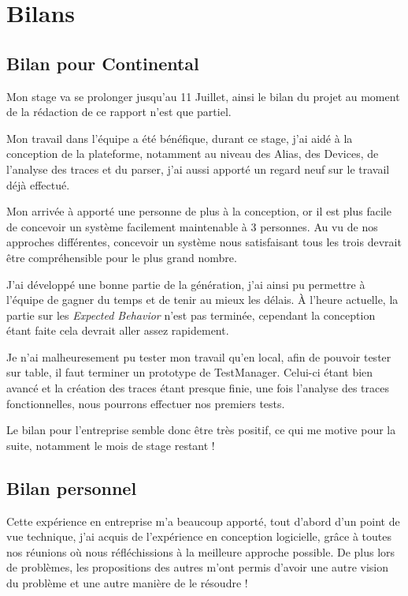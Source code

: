 \chapter{Bilans}
	\section{Bilan pour Continental}
	Mon stage va se prolonger jusqu'au 11 Juillet, ainsi le bilan du projet au moment de la rédaction de ce rapport n'est que partiel. 

	Mon travail dans l'équipe a été bénéfique, durant ce stage, j'ai aidé à la conception de la plateforme, notamment au niveau des Alias, des Devices, de l'analyse des traces et du parser,	j'ai aussi apporté un regard neuf sur le travail déjà effectué.

	Mon arrivée à apporté une personne de plus à la conception, or il est plus facile de concevoir un système facilement maintenable à 3 personnes. Au vu de nos
	approches différentes, concevoir un système nous satisfaisant tous les trois devrait être compréhensible pour le plus grand nombre.
	
	J'ai développé une bonne partie de la génération, j'ai ainsi pu permettre à l'équipe de gagner du temps et de
	tenir au mieux les délais. À l'heure actuelle, la partie sur les \textit{Expected Behavior} n'est pas terminée, cependant la conception étant faite cela devrait aller
	assez rapidement.
	
	Je n'ai malheuresement pu tester mon travail qu'en local, afin de pouvoir tester sur table, il faut terminer un prototype de TestManager. Celui-ci étant bien
	avancé et la création des traces étant presque finie, une fois l'analyse des traces fonctionnelles, nous pourrons effectuer nos premiers tests.

	Le bilan pour l'entreprise semble donc être très positif, ce qui me motive pour la suite, notamment le mois de stage restant !

	\section{Bilan personnel}
	Cette expérience en entreprise m'a beaucoup apporté, tout d'abord d'un point de vue technique, j'ai acquis de l'expérience en conception logicielle, grâce
	à toutes nos réunions où nous réfléchissions à la meilleure approche possible. De plus lors de problèmes, les propositions des autres m'ont permis d'avoir
	une autre vision du problème et une autre manière de le résoudre !

